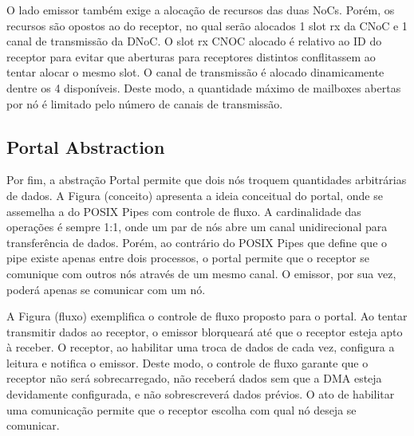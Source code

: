 				O lado emissor também exige a alocação de recursos das duas NoCs.
				Porém, os recursos são opostos ao do receptor, no qual serão alocados 1 slot rx da CNoC e 1 canal de transmissão da DNoC.
				O slot rx CNOC alocado é relativo ao ID do receptor para evitar que aberturas para receptores distintos conflitassem ao tentar alocar o mesmo slot.
				O canal de transmissão é alocado dinamicamente dentre os 4 disponíveis.
				Deste modo, a quantidade máximo de mailboxes abertas por nó é limitado pelo número de canais de transmissão.

		\subsection{Portal Abstraction}
		\label{sec.portal-abs}


			Por fim, a abstração Portal permite que dois nós troquem quantidades arbitrárias de dados.
			A Figura (conceito) apresenta a ideia conceitual do portal, onde se assemelha a do POSIX Pipes com controle de fluxo.
			A cardinalidade das operações é sempre 1:1, onde um par de nós abre um canal unidirecional para transferência de dados.
			Porém, ao contrário do POSIX Pipes que define que o pipe existe apenas entre dois processos, o portal permite que o receptor se comunique com outros nós através de um mesmo canal.
			O emissor, por sua vez, poderá apenas se comunicar com um nó.

			A Figura (fluxo) exemplifica o controle de fluxo proposto para o portal.
			Ao tentar transmitir dados ao receptor, o emissor blorqueará até que o receptor esteja apto à receber.
			O receptor, ao habilitar uma troca de dados de cada vez, configura a leitura e notifica o emissor.
			Deste modo, o controle de fluxo garante que o receptor não será sobrecarregado, não receberá dados sem que a DMA esteja devidamente configurada, e não sobrescreverá dados prévios.
			O ato de habilitar uma comunicação permite que o receptor escolha com qual nó deseja se comunicar.


